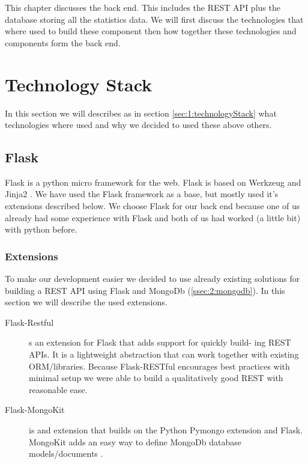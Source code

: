 
This chapter discusses the back end. This includes the REST API plus the database storing all the statistics data. We will first discuss the technologies that where used to build these component then how together these technologies and components form the back end.

\section{Technology Stack}
\label{sec:2:technologyStack}
In this section we will describes as in section \ref{sec:1:technologyStack} what technologies where used and why we decided to used these above others.

\subsection{Flask}
\label{ssec:2:flask}
Flask \cite{flask} is a python micro framework for the web. Flask is based on Werkzeug \cite{werkzeug} and Jinja2 \cite{jinja2}. We have used the Flask framework as a base, but mostly used it's extensions described below. We choose Flask for our back end because one of us already had some experience with Flask and both of us had worked (a little bit) with python before.

\subsubsection{Extensions}
To make our development easier we decided to use already existing solutions for building a REST API using Flask and MongoDb (\autoref{ssec:2:mongodb}). In this section we will describe the used extensions.

\begin{description}

\item[Flask-Restful] s an extension for Flask that adds support for quickly build- ing REST APIs. It is a lightweight abstraction that can work together with existing ORM/libraries. Because Flask-RESTful \cite{flask-restful} encourages best practices with minimal setup we were able to build a qualitatively good REST with reasonable ease.

\item[Flask-MongoKit] is and extension that builds on the Python Pymongo extension \cite{pymongo} and Flask. MongoKit adds an easy way to define MongoDb database models/documents \cite{flask-mongokit}.
\end{description}


